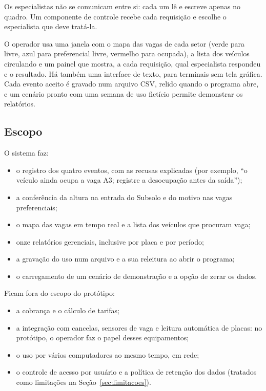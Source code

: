 Os especialistas não se comunicam entre si: cada um lê e escreve apenas no quadro. Um componente de controle recebe cada requisição e escolhe o especialista que deve tratá-la.

O operador usa uma janela com o mapa das vagas de cada setor (verde para livre, azul para preferencial livre, vermelho para ocupada), a lista dos veículos circulando e um painel que mostra, a cada requisição, qual especialista respondeu e o resultado. Há também uma interface de texto, para terminais sem tela gráfica. Cada evento aceito é gravado num arquivo CSV, relido quando o programa abre, e um cenário pronto com uma semana de uso fictício permite demonstrar os relatórios.

\subsection{Escopo}

O sistema faz:
\begin{itemize}
  \item o registro dos quatro eventos, com as recusas explicadas (por exemplo, ``o veículo ainda ocupa a vaga A3; registre a desocupação antes da saída'');
  \item a conferência da altura na entrada do Subsolo e do motivo nas vagas preferenciais;
  \item o mapa das vagas em tempo real e a lista dos veículos que procuram vaga;
  \item onze relatórios gerenciais, inclusive por placa e por período;
  \item a gravação do uso num arquivo e a sua releitura ao abrir o programa;
  \item o carregamento de um cenário de demonstração e a opção de zerar os dados.
\end{itemize}

Ficam fora do escopo do protótipo:
\begin{itemize}
  \item a cobrança e o cálculo de tarifas;
  \item a integração com cancelas, sensores de vaga e leitura automática de placas: no protótipo, o operador faz o papel desses equipamentos;
  \item o uso por vários computadores ao mesmo tempo, em rede;
  \item o controle de acesso por usuário e a política de retenção dos dados (tratados como limitações na Seção~\ref{sec:limitacoes}).
\end{itemize}

